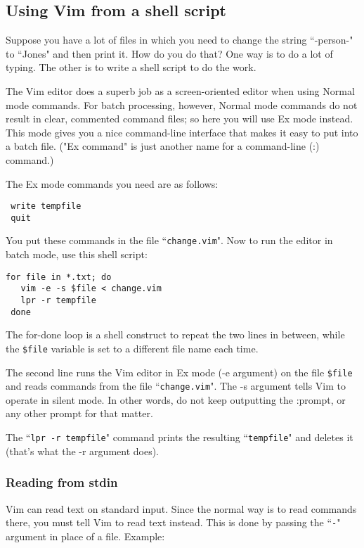 \subsection{Using Vim from a shell script}
Suppose you have a lot of files in which you need to change the string ``-person-" to ``Jones" and then print it.
How do you do that?  One way is to do a lot of typing.
The other is to write a shell script to do the work.

The Vim editor does a superb job as a screen-oriented editor when using Normal mode commands.
For batch processing, however, Normal mode commands do not result in clear, commented command files; so here you will use Ex mode instead.
This mode gives you a nice command-line interface that makes it easy to put into a batch file.
("Ex command" is just another name for a command-line (:) command.)

The Ex mode commands you need are as follows:

\begin{Verbatim}[samepage=true]
 %s/-person-/Jones/g
 write tempfile
 quit
\end{Verbatim}

You put these commands in the file ``\texttt{change.vim}".
Now to run the editor in batch mode, use this shell script:

\begin{Verbatim}[samepage=true]
 for file in *.txt; do
   vim -e -s $file < change.vim
   lpr -r tempfile
 done
\end{Verbatim}

The for-done loop is a shell construct to repeat the two lines in between, while the \texttt{\$file} variable is set to a different file name each time.

The second line runs the Vim editor in Ex mode (-e argument) on the file \texttt{\$file} and reads commands from the file ``\texttt{change.vim}".
The -s argument tells Vim to operate in silent mode.
In other words, do not keep outputting the :prompt, or any other prompt for that matter.

The ``\texttt{lpr -r tempfile}" command prints the resulting ``\texttt{tempfile}" and deletes it (that's what the -r argument does).
\subsubsection{Reading from stdin}
Vim can read text on standard input.
Since the normal way is to read commands there, you must tell Vim to read text instead.
This is done by passing the ``\texttt{-}" argument in place of a file.
Example:

